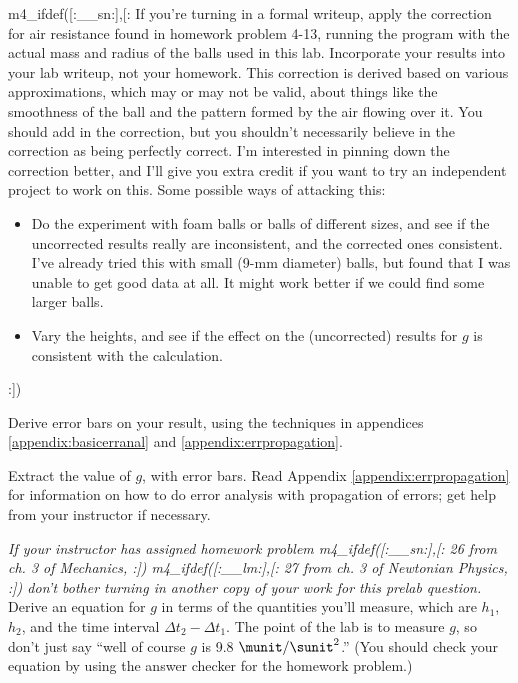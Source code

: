 m4_ifdef([:__sn:],[:%
If you're turning in a formal writeup,
apply the correction for air resistance found in homework problem 4-13, running the program with the actual mass and radius of
the balls used in this lab. Incorporate your results into your lab writeup, not your homework.
This correction is derived based on various approximations, which may or
may not be valid, about things like the smoothness of the ball and
the pattern formed by the air flowing over it. You should add in the
correction, but you shouldn't necessarily believe in the correction
as being perfectly correct. I'm interested in pinning down the correction
better, and I'll give you extra credit if you want to try an independent
project to work on this. Some possible ways of attacking this:
\begin{itemize}
\item[] Do the experiment with foam balls or balls of different sizes, and see if the
         uncorrected results really are inconsistent, and the corrected
         ones consistent. I've already tried this with small (9-mm diameter)
         balls, but found that I was unable to get good data at all. It might
         work better if we could find some larger balls.
\item[] Vary the heights, and see if the effect on the (uncorrected) results
         for $g$ is consistent with the calculation.
\end{itemize}
:])

Derive error bars on your result, using the techniques in appendices \ref{appendix:basicerranal}
and \ref{appendix:errpropagation}.

\selfcheck

Extract the value of $g$, with error bars.
Read Appendix \ref{appendix:errpropagation} for information on how to do error analysis
with propagation of errors; get help from your instructor if necessary.

\prelab

\prelabquestion  \emph{If your instructor has assigned homework problem 
m4_ifdef([:__sn:],[:%
26 from ch. 3 of Mechanics,%
:])%
m4_ifdef([:__lm:],[:%
27 from ch. 3 of Newtonian Physics,%
:])%
 don't bother turning in another copy of your work for this prelab
question.} Derive an equation for $g$ in terms of the
quantities you'll measure, which are $h_1$,
$h_2$, and the time interval $\Delta t_2-\Delta t_1$. The point of the lab
is to measure $g$, so don't just say ``well of course $g$ is
9.8 $\munit/\sunit^2$.'' (You should check your equation by using the answer
checker for the homework problem.)
